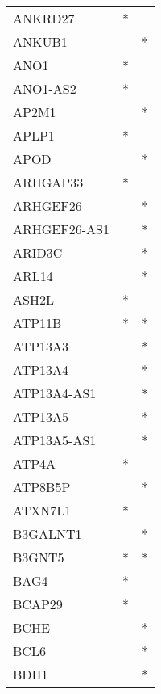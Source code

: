 \begin{longtable}{lcc}
ANKRD27          &              * &            \\
ANKUB1           &                &          * \\
ANO1             &              * &            \\
ANO1-AS2         &              * &            \\
AP2M1            &                &          * \\
APLP1            &              * &            \\
APOD             &                &          * \\
ARHGAP33         &              * &            \\
ARHGEF26         &                &          * \\
ARHGEF26-AS1     &                &          * \\
ARID3C           &                &          * \\
ARL14            &                &          * \\
ASH2L            &              * &            \\
ATP11B           &              * &          * \\
ATP13A3          &                &          * \\
ATP13A4          &                &          * \\
ATP13A4-AS1      &                &          * \\
ATP13A5          &                &          * \\
ATP13A5-AS1      &                &          * \\
ATP4A            &              * &            \\
ATP8B5P          &                &          * \\
ATXN7L1          &              * &            \\
B3GALNT1         &                &          * \\
B3GNT5           &              * &          * \\
BAG4             &              * &            \\
BCAP29           &              * &            \\
BCHE             &                &          * \\
BCL6             &                &          * \\
BDH1             &                &          * \\

\end{longtable}
